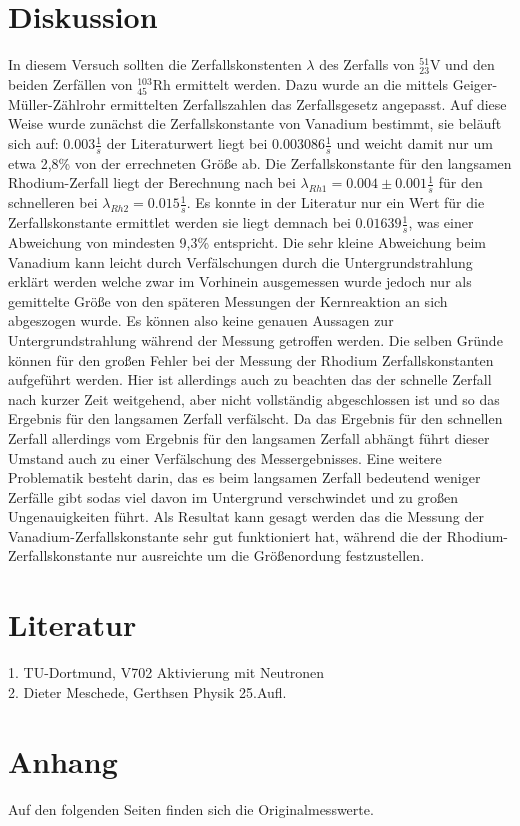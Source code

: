 \section{Diskussion}
\label{sec:diskussion}
In diesem Versuch sollten die Zerfallskonstenten $\lambda$ des Zerfalls von $^{51}_{23}\mathrm{V}$ und den 
beiden Zerfällen von $^{103}_{45}\mathrm{Rh}$ ermittelt werden. Dazu wurde an die mittels Geiger-Müller-Zählrohr
ermittelten Zerfallszahlen das Zerfallsgesetz angepasst. Auf diese Weise wurde zunächst die Zerfallskonstante
von Vanadium bestimmt, sie beläuft sich auf: $0.003\frac{1}{s}$ der Literaturwert liegt bei $0.003086\frac{1}{s}$
und weicht damit nur um etwa 2,8\% von der errechneten Größe ab. Die Zerfallskonstante für den langsamen Rhodium-Zerfall
liegt der Berechnung nach bei $\lambda_{Rh1} =0.004\pm 0.001\frac{1}{s}$ für den schnelleren bei $\lambda_{Rh2} =0.015\frac{1}{s}$.
Es konnte in der Literatur nur ein Wert für die Zerfallskonstante ermittlet werden sie liegt demnach bei 
$0.01639\frac{1}{s}$, was einer Abweichung von mindesten 9,3\% entspricht. Die sehr kleine Abweichung beim Vanadium
kann leicht durch Verfälschungen durch die Untergrundstrahlung erklärt werden welche zwar im Vorhinein 
ausgemessen wurde jedoch nur als gemittelte Größe von den späteren Messungen der Kernreaktion an sich abgeszogen wurde.
Es können also keine genauen Aussagen zur Untergrundstrahlung während der Messung getroffen werden.
Die selben Gründe können für den großen Fehler bei der Messung der Rhodium Zerfallskonstanten aufgeführt werden.
Hier ist allerdings auch zu beachten das der schnelle Zerfall nach kurzer Zeit weitgehend, aber nicht vollständig 
abgeschlossen ist und so das Ergebnis für den langsamen Zerfall verfälscht. Da das Ergebnis für den schnellen Zerfall
allerdings vom Ergebnis für den langsamen Zerfall abhängt führt dieser Umstand auch zu einer Verfälschung 
des Messergebnisses. Eine weitere Problematik besteht darin, das es beim langsamen Zerfall bedeutend weniger 
Zerfälle gibt sodas viel davon im Untergrund verschwindet und zu großen Ungenauigkeiten führt. Als Resultat kann
gesagt werden das die Messung der Vanadium-Zerfallskonstante sehr gut funktioniert hat, während die der 
Rhodium-Zerfallskonstante nur ausreichte um die Größenordung festzustellen. 



\section{Literatur}
\label{sec:literatur}
1. TU-Dortmund, V702 Aktivierung mit Neutronen\\
2. Dieter Meschede, Gerthsen Physik 25.Aufl.

\section{Anhang}
\label{sec:anhang}
Auf den folgenden Seiten finden sich die Originalmesswerte.
